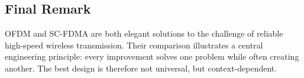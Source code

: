 \subsection{Final Remark}

OFDM and SC-FDMA are both elegant solutions to the challenge of reliable
high-speed wireless transmission. Their comparison illustrates a central
engineering principle: every improvement solves one problem while often
creating another. The best design is therefore not universal, but
context-dependent.